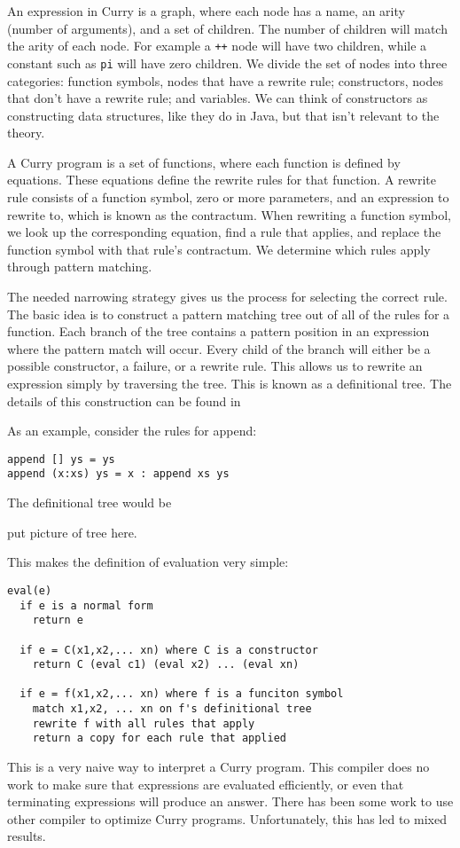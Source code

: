 An expression in Curry is a graph, where each node has a name, an arity (number of arguments),
and a set of children.
The number of children will match the arity of each node.
For example a \texttt{++} node will have two children, while a constant such as \texttt{pi} will have zero children.
We divide the set of nodes into three categories:
function symbols, nodes that have a rewrite rule; constructors, nodes that don't have a rewrite rule; and variables.
We can think of constructors as constructing data structures, like they do in Java, but that isn't relevant to the theory.

A Curry program is a set of functions, where each function is defined by equations.
These equations define the rewrite rules for that function.
A rewrite rule consists of a function symbol, zero or more parameters, and an expression to rewrite to, which is known as the contractum.
When rewriting a function symbol, we look up the corresponding equation, 
find a rule that applies, and replace the function symbol with that rule's contractum.
We determine which rules apply through pattern matching.

The needed narrowing strategy gives us the process for selecting the correct rule.
The basic idea is to construct a pattern matching tree out of all of the rules for a function.
Each branch of the tree contains a pattern position in an expression where the pattern match will occur.
Every child of the branch will either be a possible constructor, a failure, or a rewrite rule.
This allows us to rewrite an expression simply by traversing the tree.
This is known as a definitional tree.
The details of this construction can be found in \cite{defTree}

As an example, consider the rules for append:
\begin{verbatim}
append [] ys = ys
append (x:xs) ys = x : append xs ys
\end{verbatim}

\noindent
The definitional tree would be 

put picture of tree here.

\noindent
This makes the definition of evaluation very simple:

\begin{verbatim}
eval(e)
  if e is a normal form
    return e

  if e = C(x1,x2,... xn) where C is a constructor
    return C (eval c1) (eval x2) ... (eval xn) 

  if e = f(x1,x2,... xn) where f is a funciton symbol
    match x1,x2, ... xn on f's definitional tree
    rewrite f with all rules that apply
    return a copy for each rule that applied
\end{verbatim}

This is a very naive way to interpret a Curry program.
This compiler does no work to make sure that expressions are evaluated efficiently,
or even that terminating expressions will produce an answer.
There has been some work to use other compiler to optimize Curry programs.
Unfortunately, this has led to mixed results.
